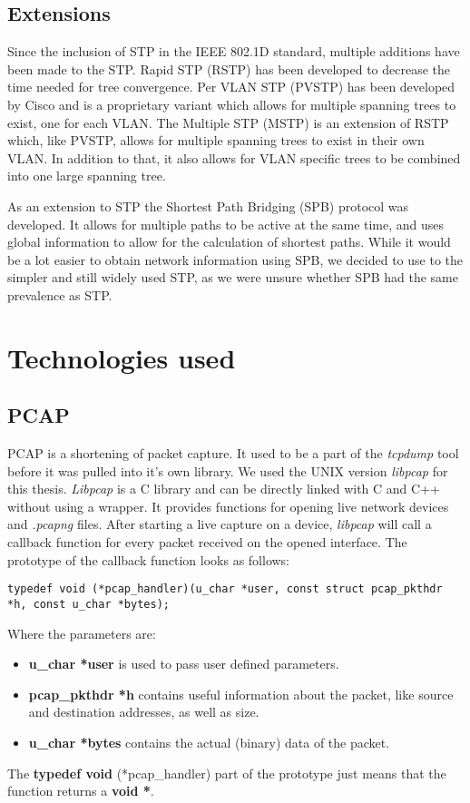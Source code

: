 \subsection*{Extensions}
Since the inclusion of STP in the IEEE 802.1D\cite{802.1D} standard, multiple additions have been made to the STP.
Rapid STP (RSTP) has been developed to decrease the time needed for tree convergence.
Per VLAN STP (PVSTP) has been developed by Cisco and is a proprietary variant which allows for multiple spanning trees to exist, one for each VLAN.
The Multiple STP (MSTP) is an extension of RSTP which, like PVSTP, allows for multiple spanning trees to exist in their own VLAN.
In addition to that, it also allows for VLAN specific trees to be combined into one large spanning tree.

As an extension to STP the Shortest Path Bridging (SPB)\cite{spb} protocol was developed.
It allows for multiple paths to be active at the same time, and uses global information to allow for the calculation of shortest paths.
While it would be a lot easier to obtain network information using SPB, we decided to use to the simpler and still widely used STP, as we were unsure whether SPB had the same prevalence as STP.

\section{Technologies used}
\subsection*{PCAP}
\label{pcap}
PCAP\cite{pcap} is a shortening of packet capture.
It used to be a part of the \textit{tcpdump} tool before it was pulled into it's own library.
We used the UNIX version \textit{libpcap} for this thesis.
\textit{Libpcap} is a C library and can be directly linked with C and C++ without using a wrapper.
It provides functions for opening live network devices and \textit{.pcapng} files.
After starting a live capture on a device, \textit{libpcap} will call a callback function for every packet received on the opened interface.
The prototype of the callback function looks as follows:
\begin{lstlisting}[caption=Pcap Callback Prototype]
typedef void (*pcap_handler)(u_char *user, const struct pcap_pkthdr *h, const u_char *bytes);
\end{lstlisting}
Where the parameters are:
\begin{itemize}
    \item \textbf{u\_char *user} is used to pass user defined parameters.
    \item \textbf{pcap\_pkthdr *h} contains useful information about the packet, like source and destination addresses, as well as size.
    \item \textbf{u\_char *bytes} contains the actual (binary) data of the packet.
\end{itemize}
The \textbf{typedef void} (*pcap\_handler) part of the prototype just means that the function returns a \textbf{void *}.

